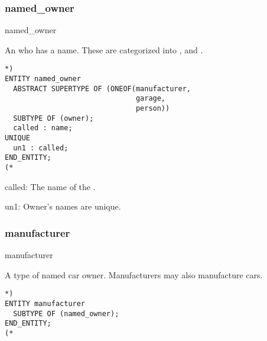 \documentclass{article}
\begin{document}
\subsubsection{named\_owner}

\begin{Mnamedesc}{named_owner}
\begin{Mdesctext}
    An  who has a name. These are categorized into
,  and .
\end{Mdesctext}

\begin{Mexp}
\begin{verbatim}
*)
ENTITY named_owner
  ABSTRACT SUPERTYPE OF (ONEOF(manufacturer,
                               garage,
                               person))
  SUBTYPE OF (owner);
  called : name;
UNIQUE
  un1 : called;
END_ENTITY;
(*
\end{verbatim}
\end{Mexp}

\begin{Matts}

\item[called:] The name of the .
\end{Matts}

\begin{Mprops}

\item[un1:] Owner's names are unique.
\end{Mprops}
\end{Mnamedesc}

\subsubsection{manufacturer}

\begin{Mnamedesc}{manufacturer}
\begin{Mdesctext}
    A type of named car owner. Manufacturers may also manufacture cars.
\end{Mdesctext}

\begin{Mexp}
\begin{verbatim}
*)
ENTITY manufacturer
  SUBTYPE OF (named_owner);
END_ENTITY;
(*
\end{verbatim}
\end{Mexp}
\end{Mnamedesc}
\end{document}
